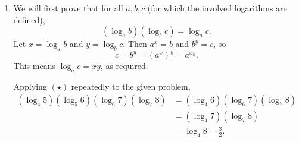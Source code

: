 \begin{enumerate}
\begin{enumerate}
\end{enumerate}
\item We will first prove that for all $a,b,c$ (for which the involved logarithms are defined),
\begin{equation*}
(\log_a b)(\log_b c) = \log_a c. \tag{$\star$}
\end{equation*}
Let $x = \log_a b$ and $y = \log_b c$. Then $a^x = b$ and $b^y = c$, so
\begin{equation*}
c = b^y = (a^x)^y = a^{xy}.
\end{equation*}
This means $\log_a c = xy$, as required.\par
Applying $(\star)$ repeatedly to the given problem,
\begin{align*}
(\log_4 5)(\log_5 6)(\log_6 7)(\log_7 8) &= (\log_4 6)(\log_6 7)(\log_7 8) \\
&= (\log_4 7)(\log_7 8) \\
&= \log_4 8 = \boxed{\frac{3}{2}}.
\end{align*}
\end{enumerate}